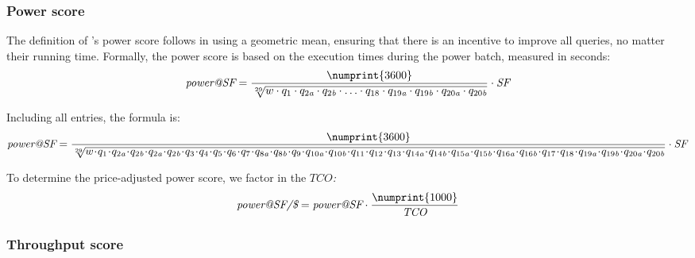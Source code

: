 \subsubsection{Power score}
\label{sec:power-score}

The definition of \snbbi's power score follows \tpcH in using a geometric mean, ensuring that there is an incentive to improve all queries, no matter their running time.
Formally, the power score is based on the execution times during the power batch, measured in seconds:
$$
\textit{power@SF} =
    \frac{\numprint{3600}}{\sqrt[29]{
        w
        \cdot q_{1}
        \cdot q_{2\variant{a}}
        \cdot q_{2\variant{b}}
        \cdot \ldots
        \cdot q_{18}
        \cdot q_{19\variant{a}}
        \cdot q_{19\variant{b}}
        \cdot q_{20\variant{a}}
        \cdot q_{20\variant{b}}
    }}
    \cdot
    \textit{SF}
$$

Including all entries, the formula is:
{\scriptsize
$$
\textit{power@SF} =
    \frac{\numprint{3600}}{\sqrt[29]{
        w
        \! \cdot \! q_{1}
        \! \cdot \! q_{2\variant{a}}
        \! \cdot \! q_{2\variant{b}}
        \! \cdot \! q_{2\variant{a}}
        \! \cdot \! q_{2\variant{b}}
        \! \cdot \! q_{3}
        \! \cdot \! q_{4}
        \! \cdot \! q_{5}
        \! \cdot \! q_{6}
        \! \cdot \! q_{7}
        \! \cdot \! q_{8\variant{a}}
        \! \cdot \! q_{8\variant{b}}
        \! \cdot \! q_{9}
        \! \cdot \! q_{10\variant{a}}
        \! \cdot \! q_{10\variant{b}}
        \! \cdot \! q_{11}
        \! \cdot \! q_{12}
        \! \cdot \! q_{13}
        \! \cdot \! q_{14\variant{a}}
        \! \cdot \! q_{14\variant{b}}
        \! \cdot \! q_{15\variant{a}}
        \! \cdot \! q_{15\variant{b}}
        \! \cdot \! q_{16\variant{a}}
        \! \cdot \! q_{16\variant{b}}
        \! \cdot \! q_{17}
        \! \cdot \! q_{18}
        \! \cdot \! q_{19\variant{a}}
        \! \cdot \! q_{19\variant{b}}
        \! \cdot \! q_{20\variant{a}}
        \! \cdot \! q_{20\variant{b}}
    }}
    \cdot
    \textit{SF}
$$
}

To determine the price-adjusted power score, we factor in the $\textit{TCO}$\emph{:}
$$ \textit{power@SF/\$} = \textit{power@SF} \cdot \frac{\numprint{1000}}{\textit{TCO}} $$

\subsubsection{Throughput score}
\label{sec:throughput-score}

